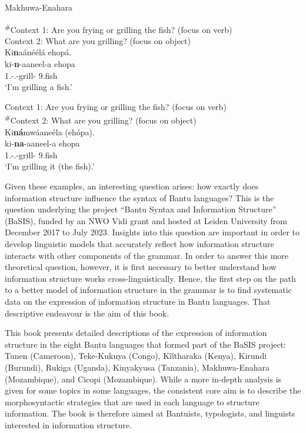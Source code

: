 \documentclass[output=paper]{langscibook}
\begin{document}
\ea
\label{ex:makhuwa:1}
Makhuwa-Enahara \citep[463]{KerrvanderWal2023}\\
\begin{xlist}
\exi{\CJ}
\textsuperscript{\#}Context 1: Are you frying or grilling the fish? (focus on verb)\\
Context 2: What are you grilling? (focus on object)\\
Ki\textbf{n}aánéélá ehopá.\\
\gll
ki-\textbf{n}{}-aaneel-a  ehopa\\
1\SG.\SM-\PRS.\CJ{}-grill-\FV{}  9.fish\\
\glt
\glt ‘I’m grilling a fish.’

\exi{\DJ}
Context 1: Are you frying or grilling the fish? (focus on verb)\\
\textsuperscript{\#}Context 2: What are you grilling? (focus on object)\\
Ki\textbf{ná}mwáaneéla (ehópa).\\
\gll
ki-\textbf{na}{}-aaneel-a  ehopa\\
1\SG{}.\SM{}-\PRS{}.\DJ{}-grill-\FV{}  9.fish\\
\glt
\glt ‘I’m grilling it (the fish).’
\end{xlist}
\z


Given these examples, an interesting question arises: how exactly does information structure influence the syntax of Bantu languages? This is the question underlying the project “Bantu Syntax and Information Structure” (BaSIS), funded by an NWO Vidi grant and hosted at Leiden University from December 2017 to July 2023. Insights into this question are important in order to develop linguistic models that accurately reflect how information structure interacts with other components of the grammar. In order to answer this more theoretical question, however, it is first necessary to better understand how information structure works cross-linguistically. Hence, the first step on the path to a better model of information structure in the grammar is to find systematic data on the expression of information structure in Bantu languages. That descriptive endeavour is the aim of this book. 

This book presents detailed descriptions of the expression of information structure in the eight Bantu languages that formed part of the BaSIS project: Tunen (Cameroon), Teke-Kukuya (Congo), Kîîtharaka (Kenya), Kirundi (Burundi), Rukiga (Uganda), Kinyakyusa (Tanzania), Makhuwa-Enahara (Mozambique), and Cicopi (Mozambique). While a more in-depth analysis is given for some topics in some languages, the consistent core aim is to describe the morphosyntactic strategies that are used in each language to structure information. The book is therefore aimed at Bantuists, typologists, and linguists interested in information structure.
\end{document}
